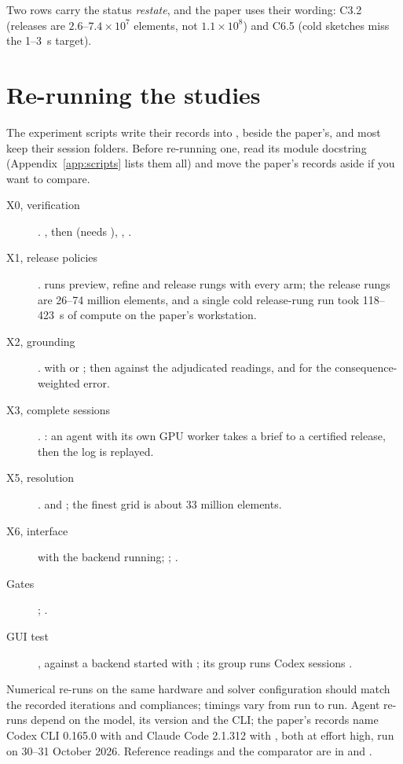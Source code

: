 Two rows carry the status \emph{restate}, and the paper uses their wording: C3.2 (releases are $2.6$--$7.4\times10^{7}$
elements, not $1.1\times10^{8}$) and C6.5 (cold sketches miss the 1--3~s target).

\section{Re-running the studies}\label{sec:rerun}
The experiment scripts write their records into , beside the paper's, and most keep their session
folders. Before re-running one, read its module docstring (Appendix~\ref{app:scripts} lists them all) and move the
paper's records aside if you want to compare.

\begin{description}
  \item[X0, verification] . ,  then
   (needs ), , .
  \item[X1, release policies] .  runs preview, refine and release rungs with every
  arm; the release rungs are 26--74 million elements, and a single cold release-rung run took 118--423~s of compute on
  the paper's workstation.
  \item[X2, grounding] .  with  or ; then
   against the adjudicated readings, and   for the consequence-weighted
  error.
  \item[X3, complete sessions]  .   : an
  agent with its own GPU worker takes a brief to a certified release, then the log is replayed.
  \item[X5, resolution] .  and ; the finest grid is about 33
  million elements.
  \item[X6, interface]   with the backend running;  ;
   .
  \item[Gates]  ;  .
  \item[GUI test]  , against a backend started with ; its
   group runs Codex sessions .
\end{description}

\begin{notebox}
Numerical re-runs on the same hardware and solver configuration should match the recorded iterations and compliances;
timings vary from run to run. Agent re-runs depend on the model, its version and the CLI; the paper's records name Codex
CLI 0.165.0 with  and Claude Code 2.1.312 with , both at effort high, run on
30--31 October 2026. Reference readings and the comparator are in  and
.
\end{notebox}
